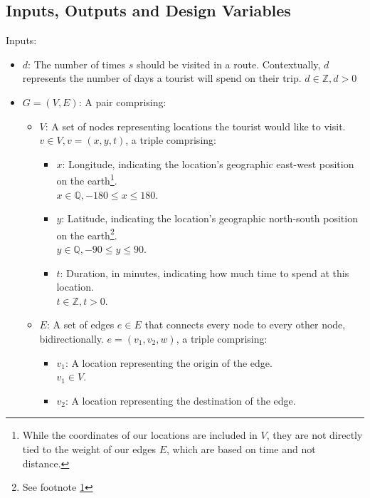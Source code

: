 \subsection{Inputs, Outputs and Design Variables}\label{subsec:inputs-and-outputs}
Inputs:
\begin{itemize}
    \item $d$: The number of times $s$ should be visited in a route.
    Contextually, $d$ represents the number of days a tourist will spend on their trip. $d \in \mathbb{Z}, d > 0$
    \item $G = (V, E)$: A pair comprising:
    \begin{itemize}
        \item[\textbullet] $V$: A set of nodes representing locations the tourist would like to visit.
        $v \in V, v = (x, y, t)$, a triple comprising:
        \begin{itemize}
            \item[\textbullet]$x$: Longitude, indicating the location's geographic east-west position on the
            earth\footnote{\label{latitude-longitude-note}While the coordinates of our locations are
            included in $V$, they are not directly tied to the weight of our edges $E$, which are based on
            time and not distance.}.\\
            $x \in \mathbb{Q}, -180 \leq x \leq 180$.
            \item[\textbullet]$y$: Latitude, indicating the location's geographic north-south position on
            the earth\footnote{See footnote \ref{latitude-longitude-note}}.\\
            $y \in \mathbb{Q}, -90 \leq y \leq 90$.
            \item[\textbullet]$t$: Duration, in minutes, indicating how much time to spend at this location.\\
            $t \in \mathbb{Z}, t > 0$.
        \end{itemize}
        \item[\textbullet] $E$: A set of edges $e \in E$ that connects every node to every other node,
        bidirectionally. $e = (v_1, v_2, w)$, a triple comprising:
        \begin{itemize}
            \item[\textbullet]$v_1$: A location representing the origin of the edge.\\
            $v_1 \in V$.
            \item[\textbullet]$v_2$: A location representing the destination of the edge.\\

\end{itemize}
\end{itemize}
\end{itemize}
